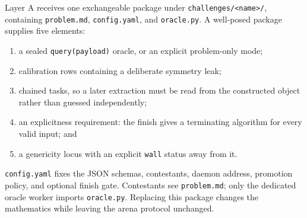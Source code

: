 \documentclass[11pt]{article}
\newcommand{\code}[1]{\texttt{#1}}
\begin{document}
Layer A receives one exchangeable package under
\code{challenges/<name>/}, containing \code{problem.md},
\code{config.yaml}, and \code{oracle.py}.  A
well-posed package supplies five elements:

\begin{enumerate}[leftmargin=*,itemsep=0.25em]
\item a sealed \code{query(payload)} oracle, or an explicit problem-only
mode;
\item calibration rows containing a deliberate symmetry leak;
\item chained tasks, so a later extraction must be read from the constructed
object rather than guessed independently;
\item an explicitness requirement: the finish gives a terminating algorithm
for every valid input; and
\item a genericity locus with an explicit \code{wall} status away from it.
\end{enumerate}

\code{config.yaml} fixes the JSON schemas, contestants, daemon address,
promotion policy, and optional finish gate.  Contestants see
\code{problem.md}; only the dedicated oracle worker imports
\code{oracle.py}.  Replacing this package changes the mathematics while
leaving the arena protocol unchanged.

\clearpage
\end{document}
